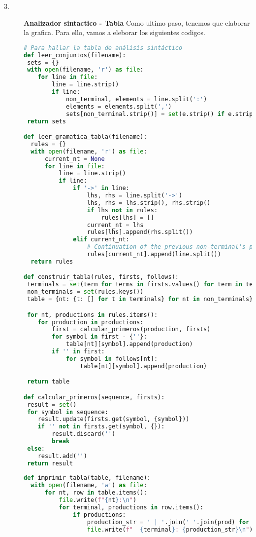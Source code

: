 \documentclass{article}
\begin{document}
\begin{description}
\item[3. ] \textbf{Analizador sintactico - Tabla} Como ultimo paso, tenemos que elaborar la grafica. Para ello, vamos a eleborar los siguientes codigos.

\begin{lstlisting}[language=Python, caption=Funcion: Elaborar Tabla]
# Para hallar la tabla de análisis sintáctico
def leer_conjuntos(filename):
 sets = {}
 with open(filename, 'r') as file:
    for line in file:
        line = line.strip()
        if line:
            non_terminal, elements = line.split(':')
            elements = elements.split(',')
            sets[non_terminal.strip()] = set(e.strip() if e.strip() != "''" else '' for e in elements if e.strip())
 return sets

def leer_gramatica_tabla(filename):
  rules = {}
  with open(filename, 'r') as file:
      current_nt = None
      for line in file:
          line = line.strip()
          if line:
              if '->' in line:
                  lhs, rhs = line.split('->')
                  lhs, rhs = lhs.strip(), rhs.strip()
                  if lhs not in rules:
                      rules[lhs] = []
                  current_nt = lhs
                  rules[lhs].append(rhs.split())
              elif current_nt:
                  # Continuation of the previous non-terminal's productions
                  rules[current_nt].append(line.split())
  return rules

def construir_tabla(rules, firsts, follows):
 terminals = set(term for terms in firsts.values() for term in terms if term != '') | {'$'}
 non_terminals = set(rules.keys())
 table = {nt: {t: [] for t in terminals} for nt in non_terminals}

 for nt, productions in rules.items():
    for production in productions:
        first = calcular_primeros(production, firsts)
        for symbol in first - {''}:
            table[nt][symbol].append(production)
        if '' in first:
            for symbol in follows[nt]:
                table[nt][symbol].append(production)

 return table

def calcular_primeros(sequence, firsts):
 result = set()
 for symbol in sequence:
    result.update(firsts.get(symbol, {symbol}))
    if '' not in firsts.get(symbol, {}):
        result.discard('')
        break
 else:
    result.add('')
 return result
  
def imprimir_tabla(table, filename):
  with open(filename, 'w') as file:
      for nt, row in table.items():
          file.write(f"{nt}:\n")
          for terminal, productions in row.items():
              if productions:
                  production_str = ' | '.join(' '.join(prod) for prod in productions)
                  file.write(f"  {terminal}: {production_str}\n")
\end{lstlisting}
\end{description}
\end{document}
